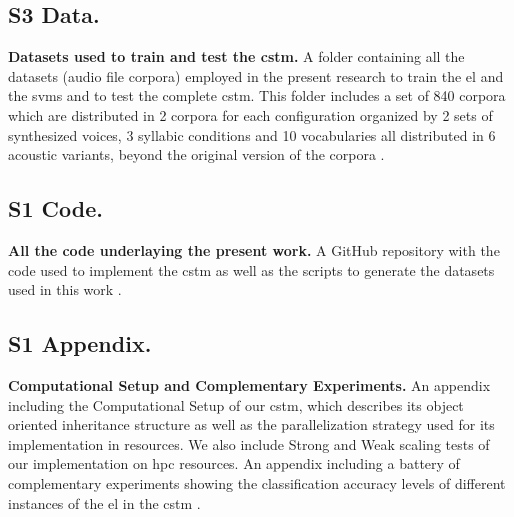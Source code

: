 {\subsection{S3 Data.}
\label{S3_Data}
{\bf Datasets used to train and test the \gls{cstm}.} A folder containing all the datasets (audio file corpora) employed in the present research to train the \gls{el} and the \glspl{svm} and to test the complete \gls{cstm}. This folder includes a set of 840 corpora which are distributed in 2 corpora for each configuration organized by 2 sets of synthesized voices, 3 syllabic conditions and 10 vocabularies all distributed in 6 acoustic variants, beyond the original version of the corpora \cite{dematties_dario_2019_2576130}.

\subsection{S1 Code.}
\label{S1_Code}
{\bf All the code underlaying the present work.} A GitHub repository with the code used to implement the \gls{cstm} as well as the scripts to generate the datasets used in this work \cite{dematties_dario_2019_2580396}.

\subsection{S1 Appendix.}
\label{S1_Appendix}
{\bf Computational Setup and Complementary Experiments.} An appendix including the Computational Setup of our \gls{cstm}, which describes its object oriented inheritance structure as well as the parallelization strategy used for its implementation in  resources. We also include Strong and Weak scaling tests of our implementation on \gls{hpc} resources. An appendix including a battery of complementary experiments showing the classification accuracy levels of different instances of the \gls{el} in the \gls{cstm} \cite{dematties_dario_2019_2654939}.
}





